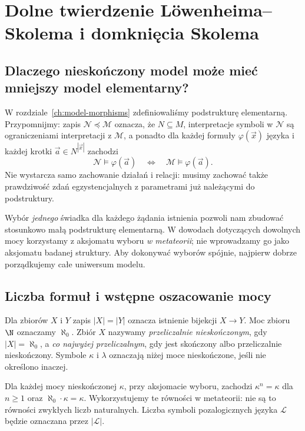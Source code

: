 \chapter{Dolne twierdzenie Löwenheima--Skolema i domknięcia Skolema}
\label{ch:downward-ls}

\providecommand{\atlasref}[2]{#2}

\section{Dlaczego nieskończony model może mieć mniejszy model elementarny?}
W rozdziale~\ref{ch:model-morphisms} zdefiniowaliśmy podstrukturę
elementarną. Przypomnijmy: zapis $\mathcal N\preccurlyeq\mathcal M$
oznacza, że $N\subseteq M$, interpretacje symboli w $\mathcal N$
są ograniczeniami interpretacji z $\mathcal M$, a ponadto
dla każdej formuły $\varphi(\vec x)$ języka i każdej
krotki $\vec a\in N^{|\vec x|}$ zachodzi
\[
\mathcal N\models\varphi(\vec a)
\quad\Longleftrightarrow\quad
\mathcal M\models\varphi(\vec a).
\]
Nie wystarcza samo zachowanie działań i relacji: musimy
zachować także prawdziwość zdań egzystencjalnych z parametrami
już należącymi do podstruktury.

Wybór \emph{jednego} świadka dla każdego żądania istnienia
pozwoli nam zbudować stosunkowo małą podstrukturę elementarną.
W dowodach dotyczących dowolnych mocy korzystamy z aksjomatu
wyboru \emph{w metateorii}; nie wprowadzamy go jako aksjomatu
badanej struktury. Aby dokonywać wyborów spójnie, najpierw
dobrze porządkujemy całe uniwersum modelu.

\section{Liczba formuł i wstępne oszacowanie mocy}
\begin{definicja}
\label{def:ls-cardinality}
Dla zbiorów $X$ i $Y$ zapis $|X|=|Y|$ oznacza istnienie
bijekcji $X\to Y$. Moc zbioru $\N$ oznaczamy $\aleph_0$.
Zbiór $X$ nazywamy \emph{przeliczalnie nieskończonym},
gdy $|X|=\aleph_0$, a \emph{co najwyżej przeliczalnym},
gdy jest skończony albo przeliczalnie nieskończony.
Symbole $\kappa$ i $\lambda$ oznaczają niżej moce
nieskończone, jeśli nie określono inaczej.
\end{definicja}

\begin{uwaga}
Dla każdej mocy nieskończonej $\kappa$, przy aksjomacie
wyboru, zachodzi $\kappa^n=\kappa$ dla $n\ge1$
oraz $\aleph_0\cdot\kappa=\kappa$.
Wykorzystujemy te równości w metateorii: nie są to
równości zwykłych liczb naturalnych. Liczba symboli
pozalogicznych języka $\mathcal L$ będzie oznaczana
przez $|\mathcal L|$.
\end{uwaga}

